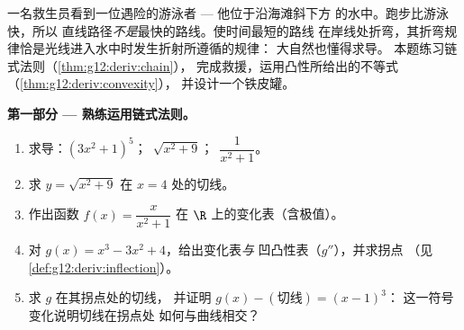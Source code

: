 \begin{problem}
\label{pb:g12:deriv:1}
一名救生员看到一位遇险的游泳者 --- 他位于沿海滩斜下方
的水中。跑步比游泳快，所以
直线路径\emph{不是}最快的路线。使时间最短的路线
在岸线处折弯，其折弯规律恰是光线进入水中时发生折射所遵循的规律：
大自然也懂得求导。
本题练习链式法则（\cref{thm:g12:deriv:chain}），
完成救援，运用凸性所给出的不等式
（\cref{thm:g12:deriv:convexity}），
并设计一个铁皮罐。

\medskip
\noindent\textbf{第一部分 --- 熟练运用链式法则。}
\begin{enumerate}
  \item 求导：$\left(3x^2 + 1\right)^5$；\
        $\sqrt{x^2 + 9}$；\ $\dfrac{1}{x^2 + 1}$。
  \item 求 $y = \sqrt{x^2 + 9}$ 在 $x = 4$ 处的切线。
  \item 作出函数
        $f(x) = \dfrac{x}{x^2 + 1}$ 在 $\R$ 上的变化表（含极值）。
  \item 对 $g(x) = x^3 - 3x^2 + 4$，给出变化表\emph{与}
        凹凸性表（$g''$），并求拐点
        （见\cref{def:g12:deriv:inflection}）。
  \item 求 $g$ 在其拐点处的切线，
        并证明 $g(x) - (\text{切线}) = (x - 1)^3$：
        这一符号变化说明切线在拐点处
        如何与曲线相交？
\end{enumerate}


\end{problem}
